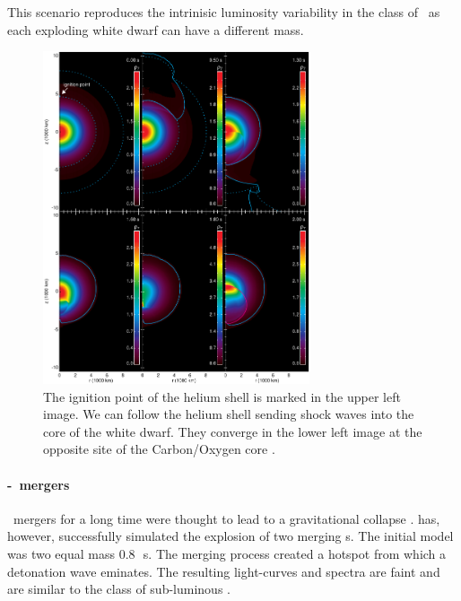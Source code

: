 This scenario reproduces the intrinisic luminosity variability in the class of \snia\ as each exploding white dwarf can have a different mass. 

\begin{figure}[htbp] %
   \centering
   \includegraphics[width=0.7\textwidth]{chapter_intro/plots/fink2010.pdf} 
   \caption{The ignition point of the helium shell is marked in the upper left image. We can follow the helium shell sending shock waves into the core of the white dwarf. They converge in the lower left image at the opposite site of the Carbon/Oxygen core \citep[data from][figure kindly provided by Michael Fink]{2010A&A...514A..53F}. }
   \label{fig:subch_fink2010}
\end{figure}

\paragraph{\WD-\WD\ mergers}
\cowd\ mergers for a long time were thought to lead to a gravitational collapse \citep[same mechanism as the \onemgwd][]{1985A&A...150L..21S}. \citet{2010Natur.463...61P} has, however, successfully simulated the explosion of two merging \cowd s. The initial model was two equal mass 0.8\,\msun\ \cowd s. The merging process created a hotspot from which a detonation wave eminates. 
The resulting light-curves and spectra are faint and are similar to the class of sub-luminous \snia. 


